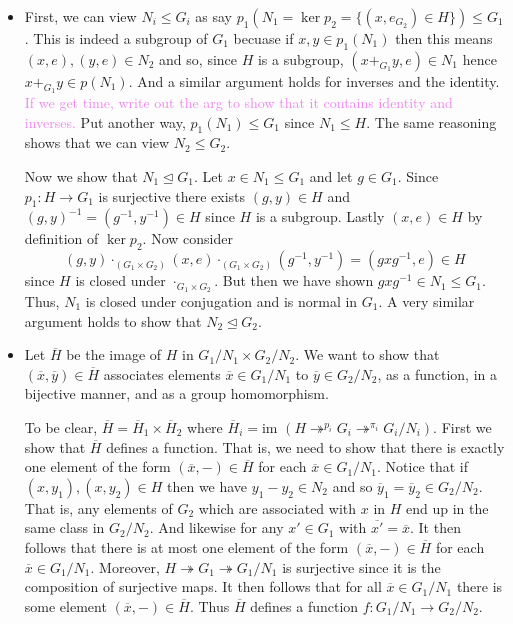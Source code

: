 \documentclass[12pt,letterpaper,boxed]{hmcpset}
\newcommand{\wg}[1]{\textcolor{violet}{#1}}
\newcommand{\im}{\text{im }}
\newcommand{\inv}{^{-1}}
\newcommand{\normal}{\unlhd} %
\begin{document}
\begin{solution}
\begin{itemize}
\item First, we can view $N_i \leq G_i$ as say $p_1(N_1 = \ker p_2 =
\{(x,e_{G_2}) \in H\}) \leq
G_1$. This is indeed a subgroup of $G_1$ becuase if $x, y \in
p_1(N_1)$ then this means $(x, e), (y, e) \in N_2$ and so, since $H$
is a subgroup, $(x +_{G_1} y, e)
\in N_1$ hence $x +_{G_1} y \in p(N_1)$. And a similar argument holds for inverses and
the identity. 
\wg{If we get time, write out the arg to show that it contains identity and inverses.}
Put another way, $p_1(N_1) \leq G_1$ since $N_1 \leq H$. 
The same reasoning shows that we can view $N_2 \leq G_2$. 

Now we show that $N_1 \unlhd G_1$.
Let $x \in N_1 \leq G_1$ and let $g \in G_1$. Since $p_1: H \to G_1$
is surjective there exists $(g, y) \in H$ and $(g, y)\inv = (g\inv, y\inv) \in H$
since $H$ is a subgroup. Lastly $(x,e) \in H$ by definition of $\ker
p_2$. 
Now consider \[
	(g, y) \cdot_{(G_1 \times G_2)} (x, e) \cdot_{(G_1 \times G_2)} (g\inv, y\inv) 
	= (g x g\inv, e) \in H
\]
since $H$ is closed under $\cdot_{G_1 \times G_2}$. But then we have
shown $g x g\inv \in N_1 \leq G_1$. Thus, $N_1$ is closed under
conjugation and is normal in $G_1$. A very similar argument holds to
show that $N_2 \normal G_2$. 

\item Let $\overline H$ be the image of $H$ in $G_1/N_1 \times
G_2/N_2$. We want to show that $(\overline x, \overline y) \in
\overline H$ associates elements $\overline x \in G_1/N_1$ to
$\overline y \in G_2 /N_2$, as a function, in a bijective manner, and
as a group homomorphism.

To be clear, $\overline H = \overline H_1 \times \overline H_2$ where
$\overline H_i = \im (H \twoheadrightarrow^{p_i} G_i
\twoheadrightarrow^{\pi_i} G_i / N_i)$. 
First we show that $\overline H$ defines a function. That is, we need
to show that there is exactly one element of the form $(\overline x,
-) \in \overline H$ for each $\overline x \in G_1/N_1$. 
Notice that if $(x, y_1), (x, y_2) \in H$ then we have $y_1 - y_2 \in
N_2$ and so $\overline y_1 = \overline y_2 \in G_2 / N_2$. That is,
any elements of $G_2$ which are associated with $x$ in $H$
end up in the same class in $G_2 / N_2$.
And likewise for any $x' \in G_1$ with $\overline{x'} = \overline x$.
It then follows that there is
at most one element of the form $(\overline x, -) \in \overline H$ for
each $\overline x \in G_1 / N_1$. Moreover, $H
\twoheadrightarrow G_1 \twoheadrightarrow G_1/N_1$ is surjective since
it is the composition of surjective maps. It then follows that for all
$\overline x \in G_1/N_1$ there is some element $(\overline x, -) \in
\overline H$. Thus $\overline H$ defines a function $f : G_1/N_1 \to
G_2/N_2$. 


\end{itemize}
\end{solution}
\end{document}
